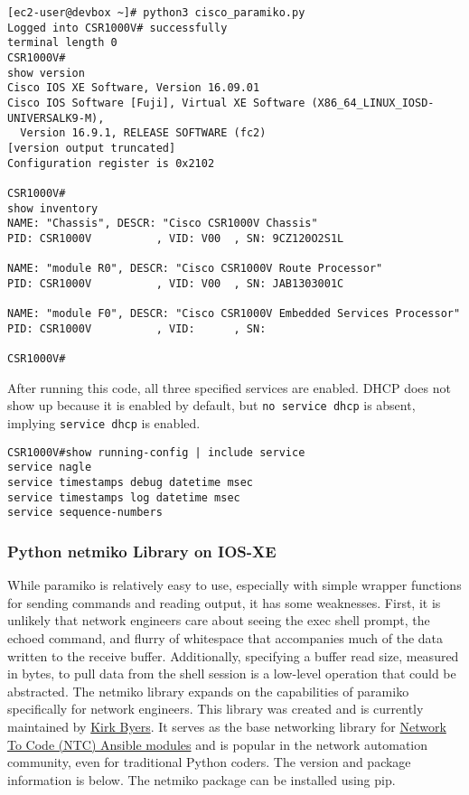 \begin{verbatim}
[ec2-user@devbox ~]# python3 cisco_paramiko.py
Logged into CSR1000V# successfully
terminal length 0
CSR1000V#
show version
Cisco IOS XE Software, Version 16.09.01
Cisco IOS Software [Fuji], Virtual XE Software (X86_64_LINUX_IOSD-UNIVERSALK9-M),
  Version 16.9.1, RELEASE SOFTWARE (fc2)
[version output truncated]
Configuration register is 0x2102

CSR1000V#
show inventory
NAME: "Chassis", DESCR: "Cisco CSR1000V Chassis"
PID: CSR1000V          , VID: V00  , SN: 9CZ120O2S1L

NAME: "module R0", DESCR: "Cisco CSR1000V Route Processor"
PID: CSR1000V          , VID: V00  , SN: JAB1303001C

NAME: "module F0", DESCR: "Cisco CSR1000V Embedded Services Processor"
PID: CSR1000V          , VID:      , SN:

CSR1000V#
\end{verbatim}

After running this code, all three specified services are enabled. DHCP does
not show up because it is enabled by default, but \verb|no service dhcp| is
absent, implying \verb|service dhcp| is enabled.
 
\begin{verbatim}
CSR1000V#show running-config | include service
service nagle
service timestamps debug datetime msec
service timestamps log datetime msec
service sequence-numbers
\end{verbatim}

\subsubsection{Python netmiko Library on IOS-XE}
While paramiko is relatively easy to use, especially with simple wrapper
functions for sending commands and reading output, it has some weaknesses.
First, it is unlikely that network engineers care about seeing the exec shell
prompt, the echoed command, and flurry of whitespace that accompanies much of
the data written to the receive buffer. Additionally, specifying a buffer read
size, measured in bytes, to pull data from the shell session is a low-level
operation that could be abstracted. The netmiko library expands on the
capabilities of paramiko specifically for network engineers. This library was
created and is currently maintained by
\href{https://pynet.twb-tech.com/blog/automation/netmiko.html}{Kirk Byers}.
It serves as the base networking library for
\href{https://github.com/networktocode/ntc-ansible}{Network To Code (NTC) Ansible modules}
and is popular in the network automation community, even for traditional Python
coders. The version and package information is below. The netmiko package can
be installed using pip.

